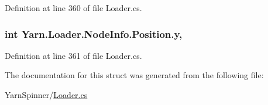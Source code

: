 Definition at line 360 of file Loader.\-cs.

\hypertarget{a00145_a390d560bd9faa3a32d8a0489c69be9e0}{
\subsubsection[{y}]{\setlength{\rightskip}{0pt plus 5cm}int Yarn.\-Loader.\-Node\-Info.\-Position.\-y\hspace{0.3cm}{\ttfamily [get]}, {\ttfamily [set]}}}\label{a00145_a390d560bd9faa3a32d8a0489c69be9e0}


Definition at line 361 of file Loader.\-cs.



The documentation for this struct was generated from the following file\-:\begin{DoxyCompactItemize}
\item 
Yarn\-Spinner/\hyperlink{a00300}{Loader.\-cs}\end{DoxyCompactItemize}
